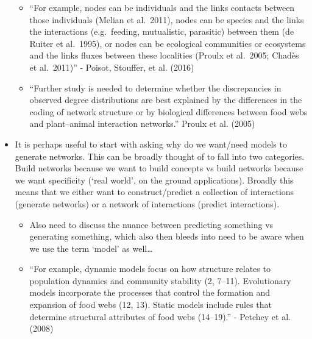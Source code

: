\documentclass[
]{agujournal2019}
\providecommand{\tightlist}{%
  \setlength{\itemsep}{0pt}\setlength{\parskip}{0pt}}\usepackage{longtable,booktabs,array}
\begin{document}
\begin{itemize}
  \begin{itemize}
  \tightlist
  \item
    ``For example, nodes can be individuals and the links contacts
    between those individuals (Melian et al.~2011), nodes can be species
    and the links the interactions (e.g.~feeding, mutualistic,
    parasitic) between them (de Ruiter et al.~1995), or nodes can be
    ecological communities or ecosystems and the links fluxes between
    these localities (Proulx et al.~2005; Chadès et al.~2011)'' -
    Poisot, Stouffer, et al. (2016)
  \item
    ``Further study is needed to determine whether the discrepancies in
    observed degree distributions are best explained by the differences
    in the coding of network structure or by biological differences
    between food webs and plant--animal interaction networks.'' Proulx
    et al. (2005)
  \end{itemize}
\item
  It is perhaps useful to start with asking why do we want/need models
  to generate networks. This can be broadly thought of to fall into two
  categories. Build networks because we want to build concepts vs build
  networks because we want specificity (`real world', on the ground
  applications). Broadly this means that we either want to
  construct/predict a collection of interactions (generate networks) or
  a network of interactions (predict interactions).

  \begin{itemize}
  \tightlist
  \item
    Also need to discuss the nuance between predicting something vs
    generating something, which also then bleeds into need to be aware
    when we use the term `model' as well\ldots{}
  \item
    ``For example, dynamic models focus on how structure relates to
    population dynamics and community stability (2, 7--11). Evolutionary
    models incorporate the processes that control the formation and
    expansion of food webs (12, 13). Static models include rules that
    determine structural attributes of food webs (14--19).'' - Petchey
    et al. (2008)
  \end{itemize}
\end{itemize}
\end{document}

